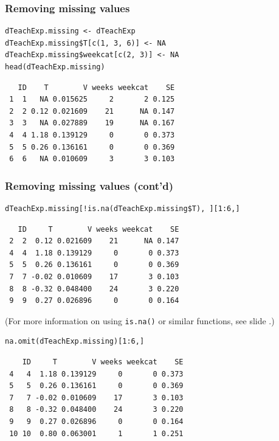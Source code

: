 \documentclass[bigger]{beamer}
\begin{document}
\begin{frame}[fragile,shrink = 20]
\frametitle{Removing missing values}
\label{sec-4-1-6}


\lstset{language=R}
\begin{lstlisting}
dTeachExp.missing <- dTeachExp
dTeachExp.missing$T[c(1, 3, 6)] <- NA
dTeachExp.missing$weekcat[c(2, 3)] <- NA
head(dTeachExp.missing)
\end{lstlisting}

\begin{verbatim}
   ID    T        V weeks weekcat    SE
 1  1   NA 0.015625     2       2 0.125
 2  2 0.12 0.021609    21      NA 0.147
 3  3   NA 0.027889    19      NA 0.167
 4  4 1.18 0.139129     0       0 0.373
 5  5 0.26 0.136161     0       0 0.369
 6  6   NA 0.010609     3       3 0.103
\end{verbatim}
\end{frame}
\begin{frame}[fragile,shrink = 20]
\frametitle{Removing missing values (cont'd)}
\label{sec-4-1-7}


\lstset{language=R}
\begin{lstlisting}
dTeachExp.missing[!is.na(dTeachExp.missing$T), ][1:6,]
\end{lstlisting}

\begin{verbatim}
   ID     T        V weeks weekcat    SE
 2  2  0.12 0.021609    21      NA 0.147
 4  4  1.18 0.139129     0       0 0.373
 5  5  0.26 0.136161     0       0 0.369
 7  7 -0.02 0.010609    17       3 0.103
 8  8 -0.32 0.048400    24       3 0.220
 9  9  0.27 0.026896     0       0 0.164
\end{verbatim}

(For more information on using \texttt{is.na()} or similar functions, see slide \pageref{slide_is_function}.)



\lstset{language=R}
\begin{lstlisting}
na.omit(dTeachExp.missing)[1:6,]
\end{lstlisting}

\begin{verbatim}
    ID     T        V weeks weekcat    SE
 4   4  1.18 0.139129     0       0 0.373
 5   5  0.26 0.136161     0       0 0.369
 7   7 -0.02 0.010609    17       3 0.103
 8   8 -0.32 0.048400    24       3 0.220
 9   9  0.27 0.026896     0       0 0.164
 10 10  0.80 0.063001     1       1 0.251
\end{verbatim}
\end{frame}
\end{document}
